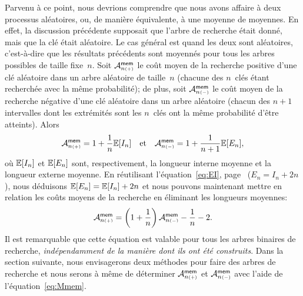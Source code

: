Parvenu à ce point, nous devrions comprendre que nous avons affaire à
deux processus aléatoires, ou, de manière équivalente, à une moyenne
de moyennes. En effet, la discussion précédente supposait que l'arbre
de recherche était donné, mais que la clé était aléatoire. Le cas
général est quand les deux sont aléatoires, c'est-à-dire que les
résultats précédents sont moyennés pour tous les arbres possibles de
taille fixe~\(n\). Soit \(\M{\fun{mem}}{n{\scriptscriptstyle (+)}}\)
 le coût moyen
de la recherche positive d'une clé aléatoire dans un arbre aléatoire de
taille~\(n\) (chacune des \(n\)~clés étant recherchée avec la même
probabilité); de plus, soit \(\M{\fun{mem}}{n{\scriptscriptstyle
    (-)}}\) le
coût moyen de la recherche négative d'une clé aléatoire dans un arbre
aléatoire (chacun des \(n+1\) intervalles dont les extrémités sont les
\(n\)~clés ont la même probabilité d'être atteints). Alors
\begin{equation}
  \M{\fun{mem}}{n{\scriptscriptstyle (+)}}
  = 1 + \frac{1}{n}\Expected{I_n}
\quad\text{et}\quad
\M{\fun{mem}}{n{\scriptscriptstyle (-)}}
  = 1 + \frac{1}{n+1}\Expected{E_n},
\label{eq:Mmems}
\end{equation}
où \(\Expected{I_n}\) et \(\Expected{E_n}\) sont, respectivement, la
longueur interne moyenne
et la longueur externe moyenne. En réutilisant l'équation~\eqref{eq:EI},
page~\pageref{eq:EI} (\(E_n = I_n + 2n\)), nous déduisons
\(\Expected{E_n} = \Expected{I_n} + 2n\) et nous pouvons maintenant
mettre en relation les coûts moyens de la recherche en éliminant les
longueurs moyennes:
\begin{equation}
\M{\fun{mem}}{n{\scriptscriptstyle (+)}} = \left(1 + \frac{1}{n}\right)
\M{\fun{mem}}{n{\scriptscriptstyle (-)}} - \frac{1}{n} - 2.
\label{eq:Mmem}
\end{equation}
Il est remarquable que cette équation est valable pour tous les arbres
binaires de recherche, \emph{indépendamment de la manière dont ils ont
  été construits}. Dans la section suivante, nous envisagerons deux
méthodes pour faire des arbres de recherche et nous serons à même de
déterminer \(\M{\fun{mem}}{n{\scriptscriptstyle (+)}}\)
 et
\(\M{\fun{mem}}{n{\scriptscriptstyle (-)}}\)
 avec l'aide de
l'équation~\eqref{eq:Mmem}.

